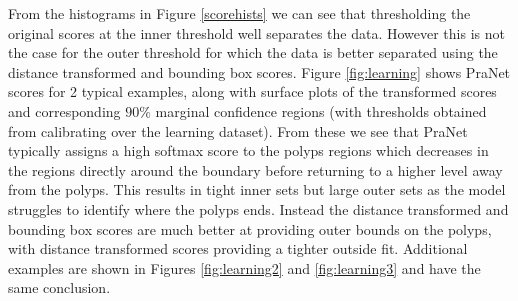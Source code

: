 From the histograms in Figure \ref{scorehists} we can see that thresholding the original scores at the inner threshold well separates the data. However this is not the case for the outer threshold for which the data is better separated using the distance transformed and bounding box scores. Figure \ref{fig:learning} shows PraNet scores for 2 typical examples, along with surface plots of the transformed scores and corresponding $90\%$ marginal confidence regions (with thresholds obtained from calibrating over the learning dataset). From these we see that PraNet typically assigns a high softmax score to the polyps regions which decreases in the regions directly around the  boundary before returning to a higher level away from the polyps. This results in tight inner sets but large outer sets as the model struggles to identify where the polyps ends. Instead the distance transformed and bounding box scores are much better at providing outer bounds on the polyps, with distance transformed scores providing a tighter outside fit. Additional examples are shown in Figures \ref{fig:learning2} and \ref{fig:learning3} and have the same conclusion.

